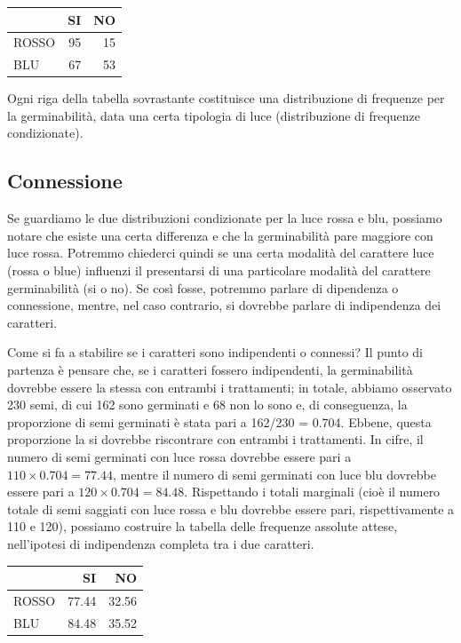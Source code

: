 \documentclass[a4paper,12pt,oneside]{book}
\begin{document}
\begin{tabular}{l|r|r}
\hline
  & SI & NO\\
\hline
ROSSO & 95 & 15\\
\hline
BLU & 67 & 53\\
\hline
\end{tabular}

Ogni riga della tabella sovrastante costituisce una distribuzione di frequenze per la germinabilità, data una certa tipologia di luce (distribuzione di frequenze condizionate).

\hypertarget{connessione}{%
\subsection{Connessione}\label{connessione}}

Se guardiamo le due distribuzioni condizionate per la luce rossa e blu, possiamo notare che esiste una certa differenza e che la germinabilità pare maggiore con luce rossa. Potremmo chiederci quindi se una certa modalità del carattere luce (rossa o blue) influenzi il presentarsi di una particolare modalità del carattere germinabilità (si o no). Se così fosse, potremmo parlare di dipendenza o connessione, mentre, nel caso contrario, si dovrebbe parlare di indipendenza dei caratteri.

Come si fa a stabilire se i caratteri sono indipendenti o connessi? Il punto di partenza è pensare che, se i caratteri fossero indipendenti, la germinabilità dovrebbe essere la stessa con entrambi i trattamenti; in totale, abbiamo osservato 230 semi, di cui 162 sono germinati e 68 non lo sono e, di conseguenza, la proporzione di semi germinati è stata pari a 162/230 = 0.704. Ebbene, questa proporzione la si dovrebbe riscontrare con entrambi i trattamenti. In cifre, il numero di semi germinati con luce rossa dovrebbe essere pari a \(110 \times 0.704 = 77.44\), mentre il numero di semi germinati con luce blu dovrebbe essere pari a \(120 \times 0.704 = 84.48\). Rispettando i totali marginali (cioè il numero totale di semi saggiati con luce rossa e blu dovrebbe essere pari, rispettivamente a 110 e 120), possiamo costruire la tabella delle frequenze assolute attese, nell'ipotesi di indipendenza completa tra i due caratteri.

\begin{tabular}{l|r|r}
\hline
  & SI & NO\\
\hline
ROSSO & 77.44 & 32.56\\
\hline
BLU & 84.48 & 35.52\\
\hline
\end{tabular}
\end{document}
